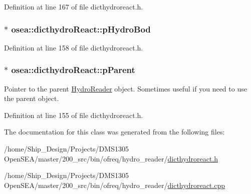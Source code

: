 Definition at line 167 of file dicthydroreact.\-h.

\hypertarget{classosea_1_1dicthydro_react_a1adaabcc5bbbbd37a0a8fdd2812f5bd6}{
\subsubsection[{p\-Hydro\-Bod}]{$\ast$ osea\-::dicthydro\-React\-::p\-Hydro\-Bod\hspace{0.3cm}{\ttfamily [protected]}}}\label{classosea_1_1dicthydro_react_a1adaabcc5bbbbd37a0a8fdd2812f5bd6}


Definition at line 158 of file dicthydroreact.\-h.

\hypertarget{classosea_1_1dicthydro_react_a0f644ee04c3e63d39761165a12cfef21}{
\subsubsection[{p\-Parent}]{$\ast$ osea\-::dicthydro\-React\-::p\-Parent\hspace{0.3cm}{\ttfamily [protected]}}}\label{classosea_1_1dicthydro_react_a0f644ee04c3e63d39761165a12cfef21}


Pointer to the parent \hyperlink{classosea_1_1_hydro_reader}{Hydro\-Reader} object. Sometimes useful if you need to use the parent object. 



Definition at line 155 of file dicthydroreact.\-h.



The documentation for this class was generated from the following files\-:\begin{DoxyCompactItemize}
\item 
/home/\-Ship\-\_\-\-Design/\-Projects/\-D\-M\-S1305 Open\-S\-E\-A/master/200\-\_\-src/bin/ofreq/hydro\-\_\-reader/\hyperlink{dicthydroreact_8h}{dicthydroreact.\-h}\item 
/home/\-Ship\-\_\-\-Design/\-Projects/\-D\-M\-S1305 Open\-S\-E\-A/master/200\-\_\-src/bin/ofreq/hydro\-\_\-reader/\hyperlink{dicthydroreact_8cpp}{dicthydroreact.\-cpp}\end{DoxyCompactItemize}
